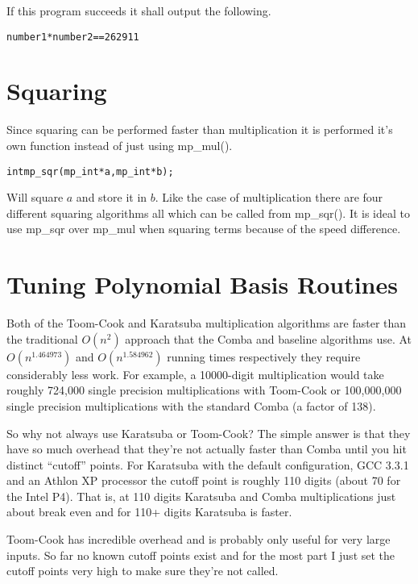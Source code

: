 \documentclass[synpaper]{book}
\begin{document}
If this program succeeds it shall output the following.

\begin{alltt}
number1 * number2 == 262911
\end{alltt}

\section{Squaring}
Since squaring can be performed faster than multiplication it is performed it's own function instead of just using
mp\_mul().

\begin{alltt}
int mp_sqr (mp_int * a, mp_int * b);
\end{alltt}

Will square $a$ and store it in $b$.  Like the case of multiplication there are four different squaring
algorithms all which can be called from mp\_sqr().  It is ideal to use mp\_sqr over mp\_mul when squaring terms because
of the speed difference.

\section{Tuning Polynomial Basis Routines}

Both of the Toom-Cook and Karatsuba multiplication algorithms are faster than the traditional $O(n^2)$ approach that
the Comba and baseline algorithms use.  At $O(n^{1.464973})$ and $O(n^{1.584962})$ running times respectively they require
considerably less work.  For example, a 10000-digit multiplication would take roughly 724,000 single precision
multiplications with Toom-Cook or 100,000,000 single precision multiplications with the standard Comba (a factor
of 138).

So why not always use Karatsuba or Toom-Cook?   The simple answer is that they have so much overhead that they're not
actually faster than Comba until you hit distinct  ``cutoff'' points.  For Karatsuba with the default configuration,
GCC 3.3.1 and an Athlon XP processor the cutoff point is roughly 110 digits (about 70 for the Intel P4).  That is, at
110 digits Karatsuba and Comba multiplications just about break even and for 110+ digits Karatsuba is faster.

Toom-Cook has incredible overhead and is probably only useful for very large inputs.  So far no known cutoff points
exist and for the most part I just set the cutoff points very high to make sure they're not called.
\end{document}
